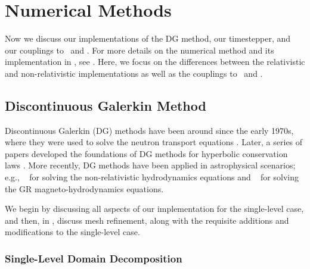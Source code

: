 \section{Numerical Methods}

Now we discuss our implementations of the DG method,
our timestepper, and our couplings to \poseidon\ and \amrex.
For more details on the numerical method and its implementation in \thornado,
see \citet{ebd2019,dem2020,pbe2021}.
Here, we focus on the differences between the
relativistic and non-relativistic implementations as well as the couplings
to \poseidon\ and \amrex.

\subsection{Discontinuous Galerkin Method}

Discontinuous Galerkin (DG) methods have been around since the early 1970s,
where they were used to solve the neutron transport equations \citep{rh1973}.
Later, a series of papers developed the foundations of
DG methods for hyperbolic conservation laws
\citep{cs1988,cs1989,cls1989,chs1990,cs1998}.
More recently, DG methods have been applied in astrophysical scenarios; e.g.,
\tenet\ \citep{sbc2015}
for solving the non-relativistic hydrodynamics equations
and \spectre\ \citep{kff2017}
for solving the GR magneto-hydrodynamics equations.

We begin by discussing all aspects of our implementation for the single-level
case, and then, in , discuss mesh refinement, along with the
requisite additions and modifications to the single-level case.

\subsubsection{Single-Level Domain Decomposition}
\label{sss.sldd}


